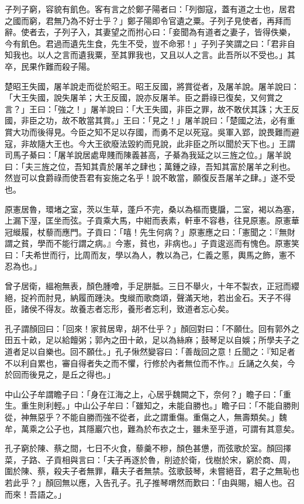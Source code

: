\begin{pinyinscope}
子列子窮，容貌有飢色。客有言之於鄭子陽者曰：「列御寇，蓋有道之士也，居君之國而窮，君無乃為不好士乎？」鄭子陽即令官遺之粟。子列子見使者，再拜而辭。使者去，子列子入，其妻望之而拊心曰：「妾聞為有道者之妻子，皆得佚樂，今有飢色。君過而遺先生食，先生不受，豈不命邪！」子列子笑謂之曰：「君非自知我也。以人之言而遺我粟，至其罪我也，又且以人之言。此吾所以不受也。」其卒，民果作難而殺子陽。

楚昭王失國，屠羊說走而從於昭王。昭王反國，將賞從者，及屠羊說。屠羊說曰：「大王失國，說失屠羊；大王反國，說亦反屠羊。臣之爵祿已復矣，又何賞之言？」王曰：「強之！」屠羊說曰：「大王失國，非臣之罪，故不敢伏其誅；大王反國，非臣之功，故不敢當其賞。」王曰：「見之！」屠羊說曰：「楚國之法，必有重賞大功而後得見。今臣之知不足以存國，而勇不足以死寇。吳軍入郢，說畏難而避寇，非故隨大王也。今大王欲廢法毀約而見說，此非臣之所以聞於天下也。」王謂司馬子綦曰：「屠羊說居處卑賤而陳義甚高，子綦為我延之以三旌之位。」屠羊說曰：「夫三旌之位，吾知其貴於屠羊之肆也；萬鍾之祿，吾知其富於屠羊之利也。然豈可以食爵祿而使吾君有妄施之名乎！說不敢當，願復反吾屠羊之肆。」遂不受也。

原憲居魯，環堵之室，茨以生草，蓬戶不完，桑以為樞而甕牖，二室，褐以為塞，上漏下溼，匡坐而弦。子貢乘大馬，中紺而表素，軒車不容巷，往見原憲。原憲華冠縰履，杖藜而應門。子貢曰：「嘻！先生何病？」原憲應之曰：「憲聞之：『無財謂之貧，學而不能行謂之病。』今憲，貧也，非病也。」子貢逡巡而有愧色。原憲笑曰：「夫希世而行，比周而友，學以為人，教以為己，仁義之慝，輿馬之飾，憲不忍為也。」

曾子居衛，縕袍無表，顏色腫噲，手足胼胝。三日不舉火，十年不製衣，正冠而纓絕，捉衿而肘見，納履而踵決。曳縰而歌商頌，聲滿天地，若出金石。天子不得臣，諸侯不得友。故養志者忘形，養形者忘利，致道者忘心矣。

孔子謂顏回曰：「回來！家貧居卑，胡不仕乎？」顏回對曰：「不願仕。回有郭外之田五十畝，足以給饘粥；郭內之田十畝，足以為絲麻；鼓琴足以自娛；所學夫子之道者足以自樂也。回不願仕。」孔子愀然變容曰：「善哉回之意！丘聞之：『知足者不以利自累也，審自得者失之而不懼，行修於內者無位而不怍。』丘誦之久矣，今於回而後見之，是丘之得也。」

中山公子牟謂瞻子曰：「身在江海之上，心居乎魏闕之下，奈何？」瞻子曰：「重生。重生則利輕。」中山公子牟曰：「雖知之，未能自勝也。」瞻子曰：「不能自勝則從，神無惡乎？不能自勝而強不從者，此之謂重傷。重傷之人，無壽類矣。」魏牟，萬乘之公子也，其隱巖穴也，難為於布衣之士，雖未至乎道，可謂有其意矣。

孔子窮於陳、蔡之間，七日不火食，藜羹不糝，顏色甚憊，而弦歌於室。顏回擇菜，子路、子貢相與言曰：「夫子再逐於魯，削迹於衛，伐樹於宋，窮於商、周，圍於陳、蔡，殺夫子者無罪，藉夫子者無禁。弦歌鼓琴，未嘗絕音，君子之無恥也若此乎？」顏回無以應，入告孔子。孔子推琴喟然而歎曰：「由與賜，細人也。召而來！吾語之。」


\end{pinyinscope}
